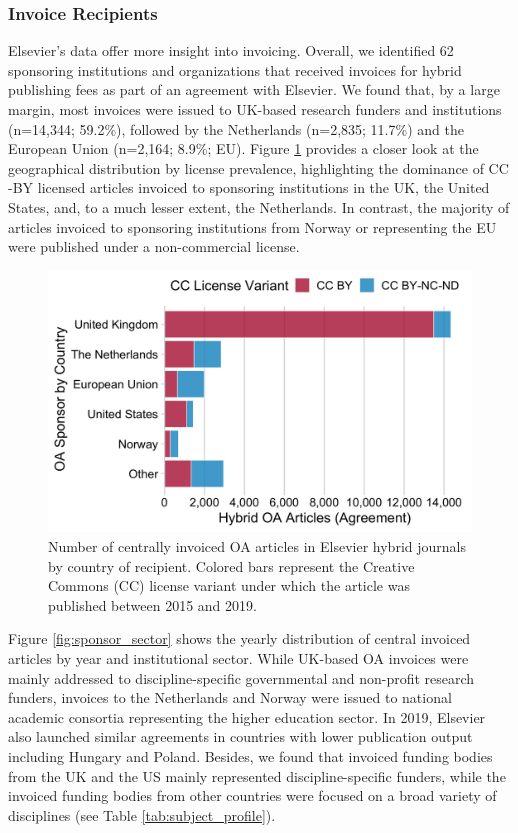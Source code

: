\documentclass[a4paper,man,floatsintext,longtable,noextraspace,12pt]{apa6}
\begin{document}
\hypertarget{invoice-recipients}{%
\subsubsection*{Invoice Recipients}\label{invoice-recipients}}

Elsevier's data offer more insight into invoicing. Overall, we
identified 62 sponsoring institutions and organizations that received
invoices for hybrid publishing fees as part of an agreement with
Elsevier. We found that, by a large margin, most invoices were issued to
UK-based research funders and institutions (n=14,344; 59.2\%), followed
by the Netherlands (n=2,835; 11.7\%) and the European Union (n=2,164;
8.9\%; EU). Figure \ref{fig:invoice_sponsor_country} provides a closer
look at the geographical distribution by license prevalence,
highlighting the dominance of CC -BY licensed articles invoiced to
sponsoring institutions in the UK, the United States, and, to a much
lesser extent, the Netherlands. In contrast, the majority of articles
invoiced to sponsoring institutions from Norway or representing the EU
were published under a non-commercial license.

\begin{figure}[H]

{\centering \includegraphics[width=0.7\linewidth,]{manuscript_files/figure-latex/invoice_sponsor_country-1} 

}

\caption{Number of centrally invoiced OA articles in Elsevier hybrid journals by country of recipient. Colored bars represent the Creative Commons (CC) license variant under which the article was published between 2015 and 2019.}\label{fig:invoice_sponsor_country}
\end{figure}

Figure \ref{fig:sponsor_sector} shows the yearly distribution of central
invoiced articles by year and institutional sector. While UK-based OA
invoices were mainly addressed to discipline-specific governmental and
non-profit research funders, invoices to the Netherlands and Norway were
issued to national academic consortia representing the higher education
sector. In 2019, Elsevier also launched similar agreements in countries
with lower publication output including Hungary and Poland. Besides, we
found that invoiced funding bodies from the UK and the US mainly
represented discipline-specific funders, while the invoiced funding
bodies from other countries were focused on a broad variety of
disciplines (see Table \ref{tab:subject_profile}).
\end{document}
